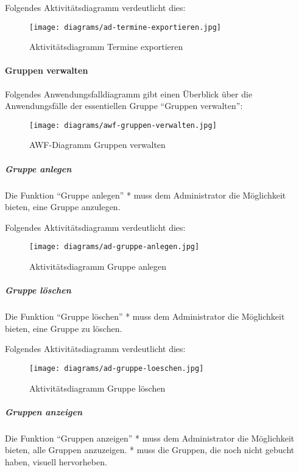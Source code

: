 \documentclass[]{article}
\let\oldparagraph\paragraph
\renewcommand{\paragraph}[1]{\oldparagraph{#1}\mbox{}}
\let\oldsubparagraph\subparagraph
\renewcommand{\subparagraph}[1]{\oldsubparagraph{#1}\mbox{}}
\begin{document}
Folgendes Aktivitätsdiagramm verdeutlicht dies:

\begin{figure}
\centering
\texttt{[image: diagrams/ad-termine-exportieren.jpg]}
\caption{Aktivitätsdiagramm Termine exportieren}
\end{figure}

\hypertarget{gruppen-verwalten}{%
\paragraph{Gruppen verwalten}\label{gruppen-verwalten}}

Folgendes Anwendungsfalldiagramm gibt einen Überblick über die
Anwendungsfälle der essentiellen Gruppe ``Gruppen verwalten'':

\begin{figure}
\centering
\texttt{[image: diagrams/awf-gruppen-verwalten.jpg]}
\caption{AWF-Diagramm Gruppen verwalten}
\end{figure}

\hypertarget{gruppe-anlegen}{%
\subparagraph{Gruppe anlegen}\label{gruppe-anlegen}}

Die Funktion ``Gruppe anlegen'' * muss dem Administrator die Möglichkeit
bieten, eine Gruppe anzulegen.

Folgendes Aktivitätsdiagramm verdeutlicht dies:

\begin{figure}
\centering
\texttt{[image: diagrams/ad-gruppe-anlegen.jpg]}
\caption{Aktivitätsdiagramm Gruppe anlegen}
\end{figure}

\hypertarget{gruppe-luxf6schen}{%
\subparagraph{Gruppe löschen}\label{gruppe-luxf6schen}}

Die Funktion ``Gruppe löschen'' * muss dem Administrator die Möglichkeit
bieten, eine Gruppe zu löschen.

Folgendes Aktivitätsdiagramm verdeutlicht dies:

\begin{figure}
\centering
\texttt{[image: diagrams/ad-gruppe-loeschen.jpg]}
\caption{Aktivitätsdiagramm Gruppe löschen}
\end{figure}

\hypertarget{gruppen-anzeigen}{%
\subparagraph{Gruppen anzeigen}\label{gruppen-anzeigen}}

Die Funktion ``Gruppen anzeigen'' * muss dem Administrator die
Möglichkeit bieten, alle Gruppen anzuzeigen. * muss die Gruppen, die
noch nicht gebucht haben, visuell hervorheben.
\end{document}
